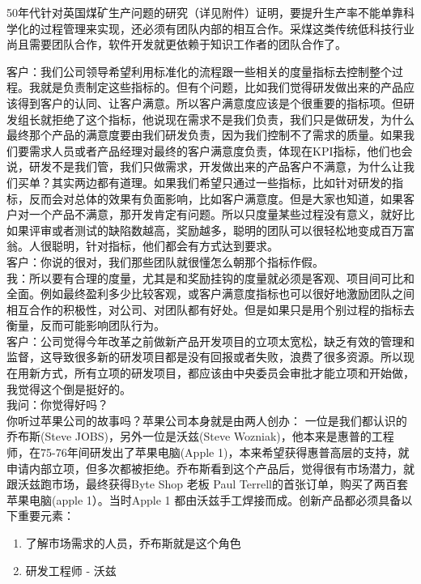 50年代针对英国煤矿生产问题的研究（详见附件）证明，要提升生产率不能单靠科学化的过程管理来实现，还必须有团队内部的相互合作。采煤这类传统低科技行业尚且需要团队合作，软件开发就更依赖于知识工作者的团队合作了。

客户：我们公司领导希望利用标准化的流程跟一些相关的度量指标去控制整个过程。我就是负责制定这些指标的。但有个问题，比如我们觉得研发做出来的产品应该得到客户的认同、让客户满意。所以客户满意度应该是个很重要的指标项。但研发组长就拒绝了这个指标，他说现在需求不是我们负责，我们只是做研发，为什么最终那个产品的满意度要由我们研发负责，因为我们控制不了需求的质量。如果我们要需求人员或者产品经理对最终的客户满意度负责，体现在KPI指标，他们也会说，研发不是我们管，我们只做需求，开发做出来的产品客户不满意，为什么让我们买单？其实两边都有道理。如果我们希望只通过一些指标，比如针对研发的指标，反而会对总体的效果有负面影响，比如客户满意度。但是大家也知道，如果客户对一个产品不满意，那开发肯定有问题。所以只度量某些过程没有意义，就好比如果评审或者测试的缺陷数越高，奖励越多，聪明的团队可以很轻松地变成百万富翁。人很聪明，针对指标，他们都会有方式达到要求。\\
客户：你说的很对，我们那些团队就很懂怎么朝那个指标作假。\\
我：所以要有合理的度量，尤其是和奖励挂钩的度量就必须是客观、项目间可比和全面。例如最终盈利多少比较客观，或客户满意度指标也可以很好地激励团队之间相互合作的积极性，对公司、对团队都有好处。但是如果只是用个别过程的指标去衡量，反而可能影响团队行为。\\
客户：公司觉得今年改革之前做新产品开发项目的立项太宽松，缺乏有效的管理和监督，这导致很多新的研发项目都是没有回报或者失败，浪费了很多资源。所以现在用新方式，所有立项的研发项目，都应该由中央委员会审批才能立项和开始做，我觉得这个倒是挺好的。\\
我问：你觉得好吗？\\
你听过苹果公司的故事吗？苹果公司本身就是由两人创办：
一位是我们都认识的乔布斯(Steve JOBS)，另外一位是沃兹(Steve
Wozniak)，他本来是惠普的工程师，在75-76年间研发出了苹果电脑(Apple
1)，本来希望获得惠普高层的支持，就申请内部立项，但多次都被拒绝。乔布斯看到这个产品后，觉得很有市场潜力，就跟沃兹跑市场，最终获得Byte
Shop 老板 Paul Terrell的首张订单，购买了两百套苹果电脑(apple
1）。当时Apple 1 都由沃兹手工焊接而成。创新产品都必须具备以下重要元素：

\begin{enumerate}
\tightlist
\item
  了解市场需求的人员，乔布斯就是这个角色
\item
  研发工程师 - 沃兹
\end{enumerate}

